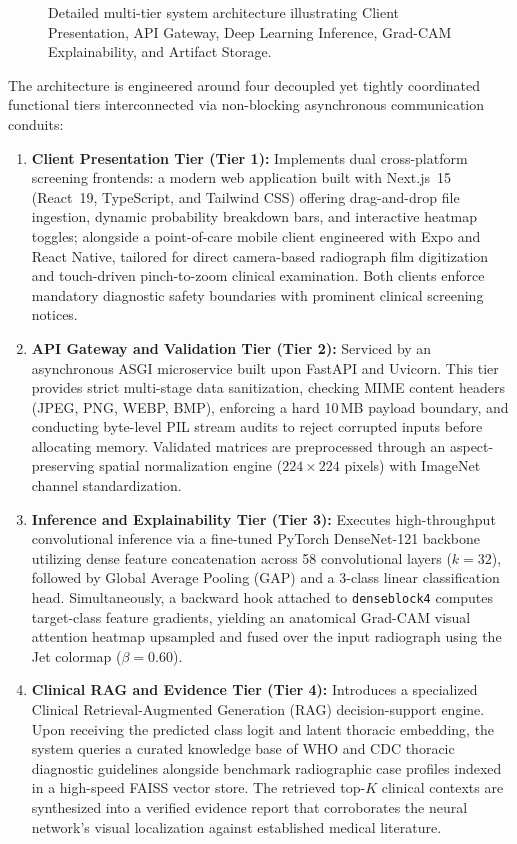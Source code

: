 \documentclass[12pt,a4paper]{report}
\begin{document}
\begin{figure}[H]
    \centering
    \caption{Detailed multi-tier system architecture illustrating Client Presentation, API Gateway, Deep Learning Inference, Grad-CAM Explainability, and Artifact Storage.}
    \label{fig:system_arch_detailed}
\end{figure}

The architecture is engineered around four decoupled yet tightly coordinated functional tiers interconnected via non-blocking asynchronous communication conduits:
\begin{enumerate}
    \item \textbf{Client Presentation Tier (Tier 1):} Implements dual cross-platform screening frontends: a modern web application built with Next.js~15 (React~19, TypeScript, and Tailwind CSS) offering drag-and-drop file ingestion, dynamic probability breakdown bars, and interactive heatmap toggles; alongside a point-of-care mobile client engineered with Expo and React Native, tailored for direct camera-based radiograph film digitization and touch-driven pinch-to-zoom clinical examination. Both clients enforce mandatory diagnostic safety boundaries with prominent clinical screening notices.
    \item \textbf{API Gateway and Validation Tier (Tier 2):} Serviced by an asynchronous ASGI microservice built upon FastAPI and Uvicorn. This tier provides strict multi-stage data sanitization, checking MIME content headers (JPEG, PNG, WEBP, BMP), enforcing a hard 10\,MB payload boundary, and conducting byte-level PIL stream audits to reject corrupted inputs before allocating memory. Validated matrices are preprocessed through an aspect-preserving spatial normalization engine ($224 \times 224$ pixels) with ImageNet channel standardization.
    \item \textbf{Inference and Explainability Tier (Tier 3):} Executes high-throughput convolutional inference via a fine-tuned PyTorch DenseNet-121 backbone utilizing dense feature concatenation across 58 convolutional layers ($k=32$), followed by Global Average Pooling (GAP) and a 3-class linear classification head. Simultaneously, a backward hook attached to \texttt{denseblock4} computes target-class feature gradients, yielding an anatomical Grad-CAM visual attention heatmap upsampled and fused over the input radiograph using the Jet colormap ($\beta=0.60$).
    \item \textbf{Clinical RAG and Evidence Tier (Tier 4):} Introduces a specialized Clinical Retrieval-Augmented Generation (RAG) decision-support engine. Upon receiving the predicted class logit and latent thoracic embedding, the system queries a curated knowledge base of WHO and CDC thoracic diagnostic guidelines alongside benchmark radiographic case profiles indexed in a high-speed FAISS vector store. The retrieved top-$K$ clinical contexts are synthesized into a verified evidence report that corroborates the neural network's visual localization against established medical literature.

\end{enumerate}
\end{document}
